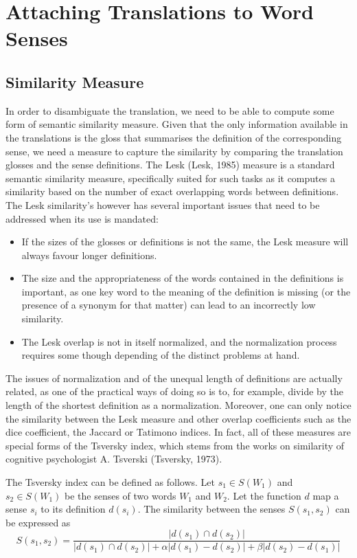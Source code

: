 \documentclass[10pt, a4paper]{article}
\begin{document}
\section{Attaching Translations to Word Senses}
\subsection{Similarity Measure}
In order to disambiguate the translation, we need to be able to compute some form of semantic similarity measure. Given that the only information available in the translations is the gloss that summarises the definition of the corresponding sense, we need a measure to capture the similarity by comparing the translation glosses and the sense definitions. The Lesk (Lesk, 1985) measure is a standard semantic similarity measure, specifically suited for such tasks as it computes a similarity based on the number of exact overlapping words between definitions. The Lesk similarity's however has several important issues that need to be addressed when its use is mandated: 
\begin{itemize}
	\item If the sizes of the glosses or definitions is not the same, the Lesk measure will always favour longer definitions.
	\item The size and the appropriateness of the words contained in the definitions is important, as one key word to the meaning of the definition is missing (or the presence of a synonym for that matter) can lead to an incorrectly low similarity.
	\item The Lesk overlap is not in itself normalized, and the normalization process requires some though depending of the distinct problems at hand.
\end{itemize}
 
 The issues of normalization and of the unequal length of definitions are actually related, as one of the practical ways of doing so is to, for example, divide by the length of the shortest definition as a normalization. Moreover, one can only notice the similarity between the Lesk measure and other overlap coefficients such as the dice coefficient, the Jaccard or Tatimono indices. In fact, all of these measures are special forms of the Tsversky index, which stems from the works on similarity of cognitive psychologist A. Tsverski (Tsversky, 1973).

The Tsversky index can be defined as follows. Let \(s_1 \in S(W_1)\)  and \(s_2 \in S(W_1)\) be the senses of two words \(W_1\) and \(W_2\). Let the function \(d\) map a sense \(s_i\) to its definition \(d(s_i)\). The similarity between the senses \(S(s_1, s_2)\) can be expressed as 
\[
S(s_1,s_2) = 
\frac{|d(s_1)\cap d(s_2)|}{|d(s_1)\cap d(s_2)| + \alpha |d(s_1)-d(s_2)| + \beta |d(s_2)-d(s_1)|}
\]
\end{document}
